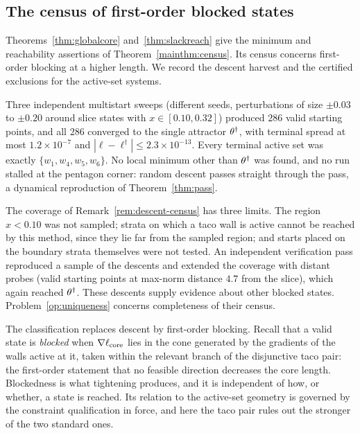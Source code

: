 


\subsection{The census of first-order blocked states}

Theorems~\ref{thm:globalcore} and~\ref{thm:slackreach} give the minimum and reachability assertions of Theorem~\ref{mainthm:census}. Its census concerns first-order blocking at a higher length. We record the descent harvest and the certified exclusions for the active-set systems.

\begin{remark}\label{rem:descent-census}
Three independent multistart sweeps (different seeds, perturbations of size $\pm0.03$ to $\pm0.20$ around slice states with $x\in[0.10,0.32]$) produced $286$ valid starting points, and all $286$ converged to the single attractor $\theta^\dagger$, with terminal spread at most $1.2\times10^{-7}$ and $|\ell-\ell^\dagger|\le2.3\times10^{-13}$. Every terminal active set was exactly $\{w_1,w_4,w_5,w_6\}$. No local minimum other than $\theta^\dagger$ was found, and no run stalled at the pentagon corner: random descent passes straight through the pass, a dynamical reproduction of Theorem~\ref{thm:pass}.
\end{remark}

The coverage of Remark~\ref{rem:descent-census} has three limits. The region $x<0.10$ was not sampled; strata on which a taco wall is active cannot be reached by this method, since they lie far from the sampled region; and starts placed on the boundary strata themselves were not tested. An independent verification pass reproduced a sample of the descents and extended the coverage with distant probes (valid starting points at max-norm distance $4.7$ from the slice), which again reached $\theta^\dagger$. These descents supply evidence about other blocked states. Problem~\ref{op:uniqueness} concerns completeness of their census.

The classification replaces descent by first-order blocking. Recall that a valid state is \emph{blocked} when $\nabla\ell_{\mathrm{core}}$ lies in the cone generated by the gradients of the walls active at it, taken within the relevant branch of the disjunctive taco pair: the first-order statement that no feasible direction decreases the core length. Blockedness is what tightening produces, and it is independent of how, or whether, a state is reached. Its relation to the active-set geometry is governed by the constraint qualification in force, and here the taco pair rules out the stronger of the two standard ones.

